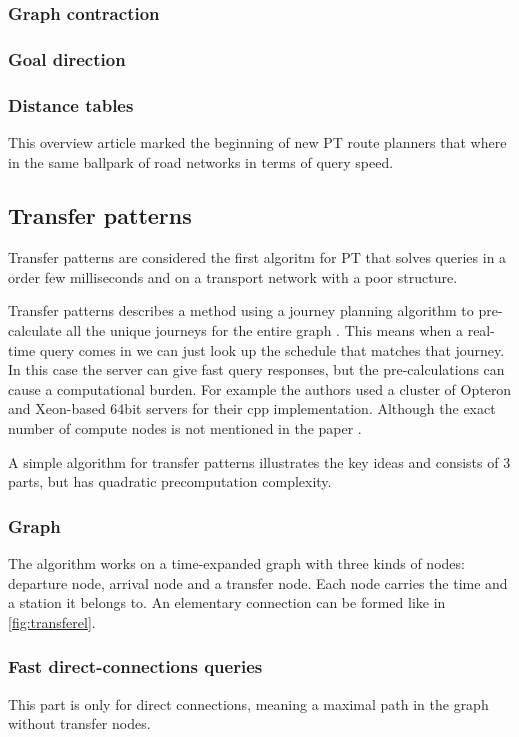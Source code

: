 \subsubsection{Graph contraction}
\subsubsection{Goal direction}
\subsubsection{Distance tables}


This overview article marked the beginning of new PT route planners that where in the same ballpark of road networks in terms of query speed. 
\subsection{Transfer patterns}
Transfer patterns are considered the first algoritm for PT that solves queries in a order few milliseconds and on a transport network with a poor structure. 

Transfer patterns describes a method using a journey planning algorithm to pre-calculate all the unique journeys for the entire graph \cite{bast_fast_2010} %
. This means when a real-time query comes in we can just look up the schedule that matches that journey. In this case the server can give fast query responses, but the pre-calculations can cause a computational burden. For example the authors used a cluster of Opteron and Xeon-based 64bit servers for their cpp implementation. Although the exact number of compute nodes is not mentioned in the paper \cite{bast_fast_2010}. 


A simple algorithm for transfer patterns illustrates the key ideas and consists of 3 parts, but has quadratic precomputation complexity.
\subsubsection{Graph}
The algorithm works on a time-expanded graph with three kinds of nodes: departure node, arrival node and a transfer node. Each node carries the time and a station it belongs to. An elementary connection can be formed like in \autoref{fig:transferel}.

\subsubsection{Fast direct-connections queries}
This part is only for direct connections, meaning a maximal path in the graph without transfer nodes.

